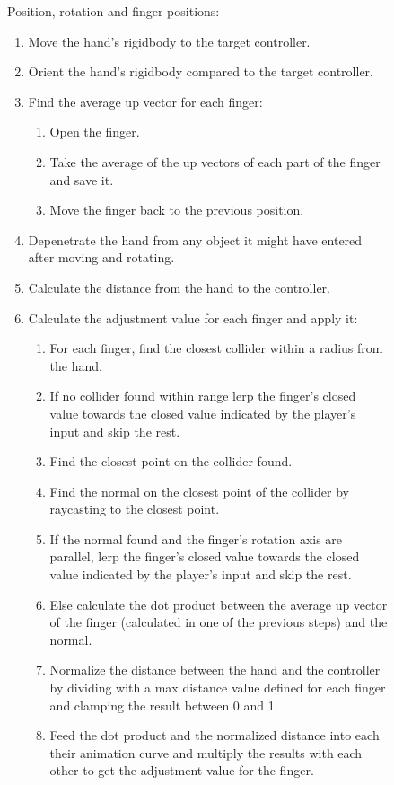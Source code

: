 \begin{figure}[H]
\centering
\footnotesize
\begin{flushleft}
Position, rotation and finger positions:
\end{flushleft}
\begin{enumerate}[noitemsep]
\item Move the hand's rigidbody to the target controller.
\item Orient the hand's rigidbody compared to the target controller.
\item Find the average up vector for each finger:
\begin{enumerate}[noitemsep]
\item Open the finger.
\item Take the average of the up vectors of each part of the finger and save it.
\item Move the finger back to the previous position.
\end{enumerate}
\item Depenetrate the hand from any object it might have entered after moving and rotating.
\item Calculate the distance from the hand to the controller.
\item Calculate the adjustment value for each finger and apply it:
\begin{enumerate}[noitemsep]
\item For each finger, find the closest collider within a radius from the hand.
\item If no collider found within range lerp the finger's closed value towards the closed value indicated by the player's input and skip the rest.
\item Find the closest point on the collider found.
\item Find the normal on the closest point of the collider by raycasting to the closest point.
\item If the normal found and the finger's rotation axis are parallel, lerp the finger's closed value towards the closed value indicated by the player's input and skip the rest.
\item Else calculate the dot product between the average up vector of the finger (calculated in one of the previous steps) and the normal.
\item Normalize the distance between the hand and the controller by dividing with a max distance value defined for each finger and clamping the result between 0 and 1.
\item Feed the dot product and the normalized distance into each their animation curve and multiply the results with each other to get the adjustment value for the finger.

\end{enumerate}
\end{enumerate}
\end{figure}
